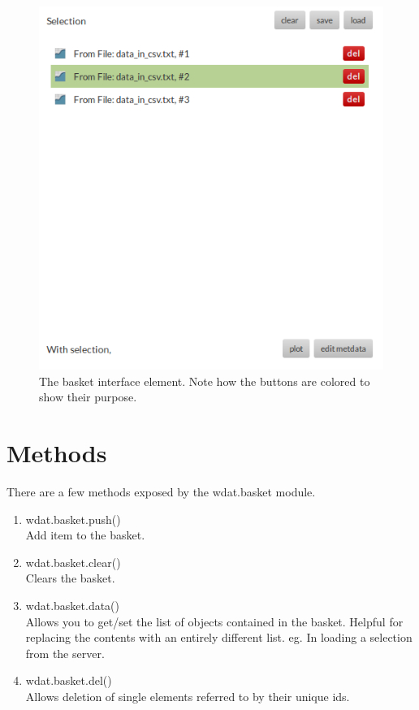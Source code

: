 \begin{figure}[h!t]
  \centering
  \includegraphics[width=\textwidth]{src/images/wdat-basket.png}
  \caption{The basket interface element. Note how the buttons are colored to show their purpose.}
\end{figure}

\section{Methods}

There are a few methods exposed by the wdat.basket module.

\begin{enumerate}
  \item{wdat.basket.push()} \hfill \\
  Add item to the basket.

  \item{wdat.basket.clear()} \hfill \\
  Clears the basket.

  \item{wdat.basket.data()} \hfill \\
  Allows you to get/set the list of objects contained in the basket.
  Helpful for replacing the contents with an entirely different list.
  eg. In loading a selection from the server.

  \item{wdat.basket.del()} \hfill \\
  Allows deletion of single elements referred to by their unique ids.
\end{enumerate}
